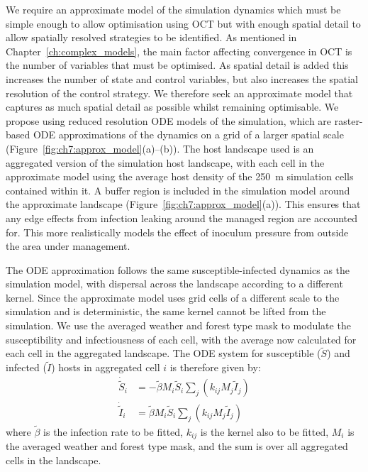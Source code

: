 We require an approximate model of the simulation dynamics which must be simple enough to allow optimisation using OCT but with enough spatial detail to allow spatially resolved strategies to be identified. As mentioned in Chapter~\ref{ch:complex_models}, the main factor affecting convergence in OCT is the number of variables that must be optimised. As spatial detail is added this increases the number of state and control variables, but also increases the spatial resolution of the control strategy. We therefore seek an approximate model that captures as much spatial detail as possible whilst remaining optimisable. We propose using reduced resolution ODE models of the simulation, which are raster-based ODE approximations of the dynamics on a grid of a larger spatial scale (Figure~\ref{fig:ch7:approx_model}(a)--(b)). The host landscape used is an aggregated version of the simulation host landscape, with each cell in the approximate model using the average host density of the \SI{250}{\meter} simulation cells contained within it. A buffer region is included in the simulation model around the approximate landscape (Figure~\ref{fig:ch7:approx_model}(a)). This ensures that any edge effects from infection leaking around the managed region are accounted for. This more realistically models the effect of inoculum pressure from outside the area under management.

The ODE approximation follows the same susceptible-infected dynamics as the simulation model, with dispersal across the landscape according to a different kernel. Since the approximate model uses grid cells of a different scale to the simulation and is deterministic, the same kernel cannot be lifted from the simulation. We use the averaged weather and forest type mask to modulate the susceptibility and infectiousness of each cell, with the average now calculated for each cell in the aggregated landscape. The ODE system for susceptible ($\tilde{S}$) and infected ($\tilde{I}$) hosts in aggregated cell $i$ is therefore given by:
\begin{subequations}
    \label{eqn:ch7:approx_model}
    \begin{align}
        \dot{\tilde{S}}_i &= -\tilde{\beta}M_i\tilde{S}_i\sum_j\left(k_{ij}M_j\tilde{I}_j\right) \\
        \dot{\tilde{I}}_i &= \tilde{\beta}M_i\tilde{S}_i\sum_j\left(k_{ij}M_j\tilde{I}_j\right)
    \end{align}
\end{subequations}
where $\tilde{\beta}$ is the infection rate to be fitted, $k_{ij}$ is the kernel also to be fitted, $M_i$ is the averaged weather and forest type mask, and the sum is over all aggregated cells in the landscape.

